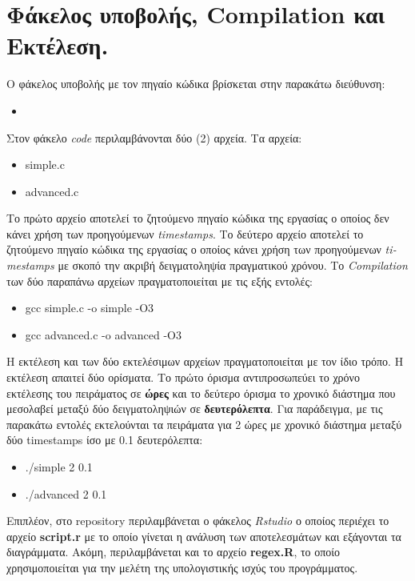 \documentclass[12pt, a4paper]{article}
\begin{document}
\section{Φάκελος υποβολής, \textlatin{Compilation} και Εκτέλεση.}
Ο φάκελος υποβολής με τον πηγαίο κώδικα βρίσκεται στην παρακάτω διεύθυνση:
\begin{itemize}
  \item \textlatin{}
\end{itemize}
Στον φάκελο \textit{\textlatin{code}} περιλαμβάνονται δύο (2) αρχεία. Τα αρχεία:
\begin{itemize}
  \item \textlatin{simple.c}
  \item \textlatin{advanced.c}
\end{itemize}
\justify
Το πρώτο αρχείο αποτελεί το ζητούμενο πηγαίο κώδικα της εργασίας ο οποίος δεν κάνει χρήση των προηγούμενων
\textit{\textlatin{timestamps}}. Το δεύτερο αρχείο αποτελεί το ζητούμενο πηγαίο κώδικα της εργασίας ο οποίος κάνει χρήση των προηγούμενων \textit{\textlatin{timestamps}} με σκοπό την ακριβή δειγματοληψία πραγματικού χρόνου.
\justify
Το \textit{\textlatin{Compilation}} των δύο παραπάνω αρχείων πραγματοποιείται με τις εξής εντολές:
\begin{itemize}
  \item \textlatin{gcc simple.c -o simple -O3}
  \item \textlatin{gcc advanced.c -o advanced -O3}
\end{itemize}

\justify
Η εκτέλεση και των δύο εκτελέσιμων αρχείων πραγματοποιείται με τον ίδιο τρόπο. Η εκτέλεση απαιτεί δύο ορίσματα. Το πρώτο όρισμα αντιπροσωπεύει το χρόνο εκτέλεσης του πειράματος σε \textbf{ώρες} και το δεύτερο όρισμα το χρονικό διάστημα που μεσολαβεί μεταξύ δύο δειγματοληψιών σε \textbf{δευτερόλεπτα}. Για παράδειγμα, με τις παρακάτω εντολές εκτελούνται τα πειράματα για 2 ώρες με χρονικό διάστημα μεταξύ δύο \textlatin{timestamps} ίσο με 0.1 δευτερόλεπτα:
\begin{itemize}
  \item \textlatin{./simple 2 0.1}
  \item \textlatin{./advanced 2 0.1}
\end{itemize}

\justify
Επιπλέον, στο \textlatin{repository} περιλαμβάνεται ο φάκελος \textit{\textlatin{Rstudio}} ο οποίος περιέχει το αρχείο \textlatin{\textbf{script.r}} με το οποίο γίνεται η ανάλυση των αποτελεσμάτων και εξάγονται τα διαγράμματα. Ακόμη, περιλαμβάνεται και το αρχείο \textlatin{\textbf{regex.R}}, το οποίο χρησιμοποιείται για την μελέτη της υπολογιστικής ισχύς του προγράμματος.
\end{document}
